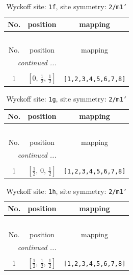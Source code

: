 \documentclass[fleqn,8pt]{jsarticle}
\begin{document}
\renewcommand{\arraystretch}{1.2}
\begin{longtable}{ccc}
\caption{Wyckoff site: {\tt 1f}, site symmetry: {\tt 2/m1'}}
 \\
 \hline \hline
No. & position & mapping \\ \hline \endfirsthead

\multicolumn{2}{l}{\tablename\ \thetable{}} \\
 \hline \hline
No. & position & mapping \\ \hline \endhead

 \hline \hline
\multicolumn{2}{r}{\footnotesize\it continued ...} \\ \endfoot

 \hline \hline
\multicolumn{2}{r}{} \\ \endlastfoot

1 & $\left[ 0,\, \frac{1}{2},\, \frac{1}{2} \right]$ & {\tt [1,2,3,4,5,6,7,8]} \\
\end{longtable}
\renewcommand{\arraystretch}{1.2}
\begin{longtable}{ccc}
\caption{Wyckoff site: {\tt 1g}, site symmetry: {\tt 2/m1'}}
 \\
 \hline \hline
No. & position & mapping \\ \hline \endfirsthead

\multicolumn{2}{l}{\tablename\ \thetable{}} \\
 \hline \hline
No. & position & mapping \\ \hline \endhead

 \hline \hline
\multicolumn{2}{r}{\footnotesize\it continued ...} \\ \endfoot

 \hline \hline
\multicolumn{2}{r}{} \\ \endlastfoot

1 & $\left[ \frac{1}{2},\, 0,\, \frac{1}{2} \right]$ & {\tt [1,2,3,4,5,6,7,8]} \\
\end{longtable}
\renewcommand{\arraystretch}{1.2}
\begin{longtable}{ccc}
\caption{Wyckoff site: {\tt 1h}, site symmetry: {\tt 2/m1'}}
 \\
 \hline \hline
No. & position & mapping \\ \hline \endfirsthead

\multicolumn{2}{l}{\tablename\ \thetable{}} \\
 \hline \hline
No. & position & mapping \\ \hline \endhead

 \hline \hline
\multicolumn{2}{r}{\footnotesize\it continued ...} \\ \endfoot

 \hline \hline
\multicolumn{2}{r}{} \\ \endlastfoot

1 & $\left[ \frac{1}{2},\, \frac{1}{2},\, \frac{1}{2} \right]$ & {\tt [1,2,3,4,5,6,7,8]} \\
\end{longtable}
\end{document}
